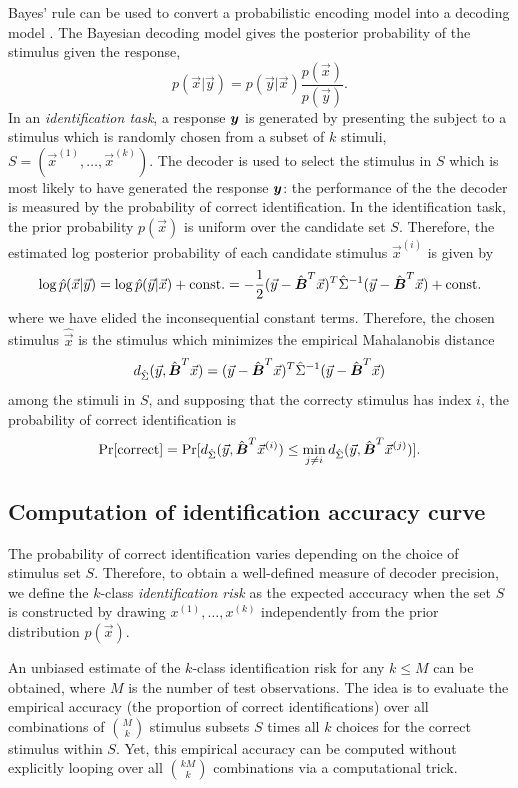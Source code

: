 Bayes' rule can be used to convert a probabilistic encoding model into a decoding model \cite{Naselaris2011}.
The Bayesian decoding model gives the posterior probability of the stimulus given the response,
\[
p(\vec{x}|\vec{y}) = p(\vec{y}|\vec{x})\frac{p(\vec{x})}{p(\vec{y})}.
\]
In an \emph{identification task}\cite{Kay2008a}, a response $\boldsymbol{y}$ is generated by presenting the subject to a stimulus which is randomly chosen from a 
subset of $k$ stimuli, $S = (\vec{x}^{(1)},\hdots, \vec{x}^{(k)})$.  The decoder is used to select the stimulus in $S$ which is most likely to have generated the response $\boldsymbol{y}$: the performance of the the decoder is measured by the probability of correct identification.
In the identification task, the prior probability $p(\vec{x})$ is uniform over the candidate set $S.$  Therefore, the estimated log posterior probability of each candidate stimulus $\vec{x}^{(i)}$ is given by
\[
\log \hat{p}(\vec{x}|\vec{y}) = \log \hat{p}(\vec{y}|\vec{x}) + \text{const.}= -\frac{1}{2}(\vec{y} - \hat{\boldsymbol{B}}^T \vec{x})^T \hat{\Sigma}^{-1} (\vec{y}-\hat{\boldsymbol{B}}^T \vec{x}) + \text{const.}
\]
where we have elided the inconsequential constant terms.
Therefore, the chosen stimulus $\hat{\vec{x}}$ is the stimulus which minimizes the empirical Mahalanobis distance 
\[
d_{\hat{\Sigma}}(\vec{y}, \hat{\boldsymbol{B}}^T \vec{x}) = (\vec{y} - \hat{\boldsymbol{B}}^T \vec{x})^T \hat{\Sigma}^{-1} (\vec{y}-\hat{\boldsymbol{B}}^T \vec{x})
\]
among the stimuli in $S$,
and supposing that the correcty stimulus has index $i$, the probability of correct identification is
\[
\Pr[\text{correct}] = \Pr[d_{\hat{\Sigma}}(\vec{y}, \hat{\boldsymbol{B}}^T \vec{x}^{(i)}) \leq \min_{j \neq i} d_{\hat{\Sigma}}(\vec{y}, \hat{\boldsymbol{B}}^T \vec{x}^{(j)}) ].
\]

\subsection{Computation of identification accuracy curve}

The probability of correct identification varies depending on the choice of stimulus set $S$.  Therefore, to obtain a well-defined measure of decoder precision, we define the $k$-class \emph{identification risk} as the expected acccuracy when the set $S$ is constructed by drawing $x^{(1)},\hdots, x^{(k)}$ independently from the prior distribution $p(\vec{x})$.  

An unbiased estimate of the $k$-class identification risk for any $k \leq M$ can be obtained, where $M$ is the number of test observations.  The idea is to evaluate the empirical accuracy (the proportion of correct identifications) over all combinations of ${M}\choose{k}$ stimulus subsets $S$ times all $k$ choices for the correct stimulus within $S$.  Yet, this empirical accuracy can be computed without explicitly looping over all $k{M}\choose{k}$ combinations via a computational trick.

